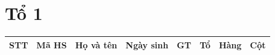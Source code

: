 ﻿%
\section*{Tổ 1}
\begin{longtable}{|c|l|p{5cm}|c|c|c|c|c|}
\hline
STT & Mã HS & Họ và tên & Ngày sinh & GT & Tổ & Hàng & Cột \\
\hline
\end{longtable}
